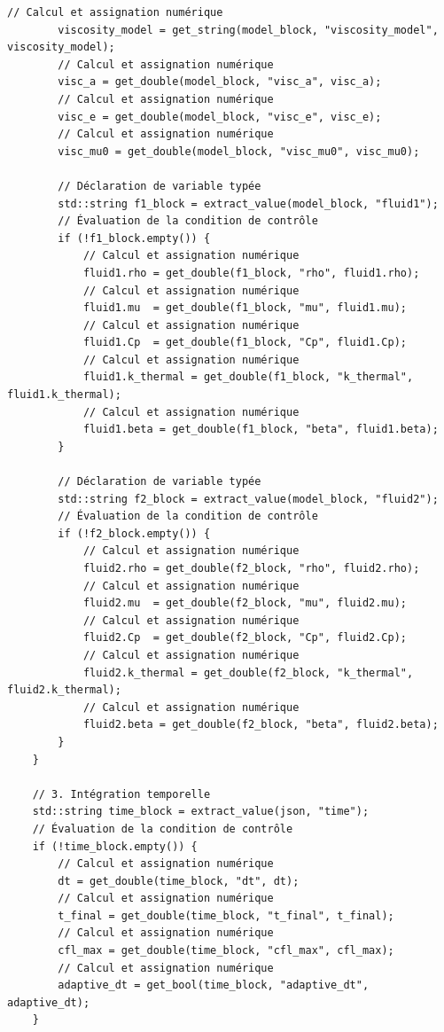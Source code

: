 \documentclass[10pt,a4paper,oneside]{book}
\begin{document}
\begin{lstlisting}[language={[11]C++}]
        // Calcul et assignation numérique
        viscosity_model = get_string(model_block, "viscosity_model", viscosity_model);
        // Calcul et assignation numérique
        visc_a = get_double(model_block, "visc_a", visc_a);
        // Calcul et assignation numérique
        visc_e = get_double(model_block, "visc_e", visc_e);
        // Calcul et assignation numérique
        visc_mu0 = get_double(model_block, "visc_mu0", visc_mu0);

        // Déclaration de variable typée
        std::string f1_block = extract_value(model_block, "fluid1");
        // Évaluation de la condition de contrôle
        if (!f1_block.empty()) {
            // Calcul et assignation numérique
            fluid1.rho = get_double(f1_block, "rho", fluid1.rho);
            // Calcul et assignation numérique
            fluid1.mu  = get_double(f1_block, "mu", fluid1.mu);
            // Calcul et assignation numérique
            fluid1.Cp  = get_double(f1_block, "Cp", fluid1.Cp);
            // Calcul et assignation numérique
            fluid1.k_thermal = get_double(f1_block, "k_thermal", fluid1.k_thermal);
            // Calcul et assignation numérique
            fluid1.beta = get_double(f1_block, "beta", fluid1.beta);
        }

        // Déclaration de variable typée
        std::string f2_block = extract_value(model_block, "fluid2");
        // Évaluation de la condition de contrôle
        if (!f2_block.empty()) {
            // Calcul et assignation numérique
            fluid2.rho = get_double(f2_block, "rho", fluid2.rho);
            // Calcul et assignation numérique
            fluid2.mu  = get_double(f2_block, "mu", fluid2.mu);
            // Calcul et assignation numérique
            fluid2.Cp  = get_double(f2_block, "Cp", fluid2.Cp);
            // Calcul et assignation numérique
            fluid2.k_thermal = get_double(f2_block, "k_thermal", fluid2.k_thermal);
            // Calcul et assignation numérique
            fluid2.beta = get_double(f2_block, "beta", fluid2.beta);
        }
    }

    // 3. Intégration temporelle
    std::string time_block = extract_value(json, "time");
    // Évaluation de la condition de contrôle
    if (!time_block.empty()) {
        // Calcul et assignation numérique
        dt = get_double(time_block, "dt", dt);
        // Calcul et assignation numérique
        t_final = get_double(time_block, "t_final", t_final);
        // Calcul et assignation numérique
        cfl_max = get_double(time_block, "cfl_max", cfl_max);
        // Calcul et assignation numérique
        adaptive_dt = get_bool(time_block, "adaptive_dt", adaptive_dt);
    }


\end{lstlisting}
\end{document}
